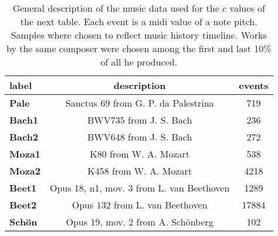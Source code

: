 \begin{table}[h!]
\begin{center}
\begin{tabular}{| l || c | c |}\hline
label & description & events \\\hline\hline
{\bf Pale} & Sanctus 69 from G. P. da Palestrina & 719 \\\hline
{\bf Bach1} & BWV735 from J. S. Bach & 236 \\\hline
{\bf Bach2} & BWV648 from J. S. Bach & 272 \\\hline
{\bf Moza1} & K80 from W. A. Mozart & 538 \\\hline
{\bf Moza2} & K458 from W. A. Mozart & 4218 \\\hline
{\bf Beet1} & Opus 18, n1, mov. 3 from L. van Beethoven & 1289 \\\hline
{\bf Beet2} & Opus 132 from L. van Beethoven & 17884 \\\hline
{\bf Sch\"on} & Opus 19, mov. 2 from A. Sch\"onberg & 102 \\\hline
\end{tabular}
\caption{General description of the music data used for the $c$ values of the next table. Each event is a midi value of a note pitch. Samples where chosen to reflect music history timeline. Works by the same composer were chosen among the first and last 10\% of all he produced.}
\end{center}
\end{table}